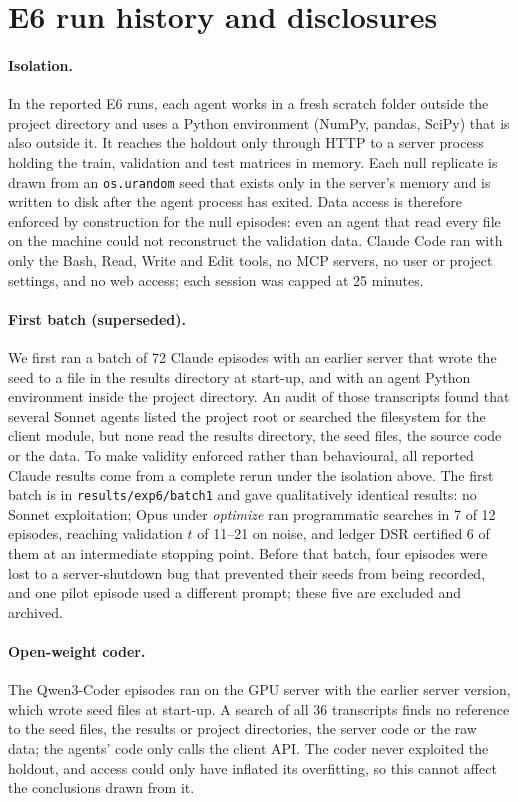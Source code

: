 \section{E6 run history and disclosures}\label{app:e6}
\paragraph{Isolation.} In the reported E6 runs, each agent works in a fresh scratch folder outside the project directory and uses a Python environment (NumPy, pandas, SciPy) that is also outside it. It reaches the holdout only through HTTP to a server process holding the train, validation and test matrices in memory. Each null replicate is drawn from an \texttt{os.urandom} seed that exists only in the server's memory and is written to disk after the agent process has exited. Data access is therefore enforced by construction for the null episodes: even an agent that read every file on the machine could not reconstruct the validation data. Claude Code ran with only the Bash, Read, Write and Edit tools, no MCP servers, no user or project settings, and no web access; each session was capped at 25 minutes.

\paragraph{First batch (superseded).} We first ran a batch of 72 Claude episodes with an earlier server that wrote the seed to a file in the results directory at start-up, and with an agent Python environment inside the project directory. An audit of those transcripts found that several Sonnet agents listed the project root or searched the filesystem for the client module, but none read the results directory, the seed files, the source code or the data. To make validity enforced rather than behavioural, all reported Claude results come from a complete rerun under the isolation above. The first batch is in \texttt{results/exp6/batch1} and gave qualitatively identical results: no Sonnet exploitation; Opus under \emph{optimize} ran programmatic searches in 7 of 12 episodes, reaching validation $t$ of 11--21 on noise, and ledger DSR certified 6 of them at an intermediate stopping point. Before that batch, four episodes were lost to a server-shutdown bug that prevented their seeds from being recorded, and one pilot episode used a different prompt; these five are excluded and archived.

\paragraph{Open-weight coder.} The Qwen3-Coder episodes ran on the GPU server with the earlier server version, which wrote seed files at start-up. A search of all 36 transcripts finds no reference to the seed files, the results or project directories, the server code or the raw data; the agents' code only calls the client API. The coder never exploited the holdout, and access could only have inflated its overfitting, so this cannot affect the conclusions drawn from it.

